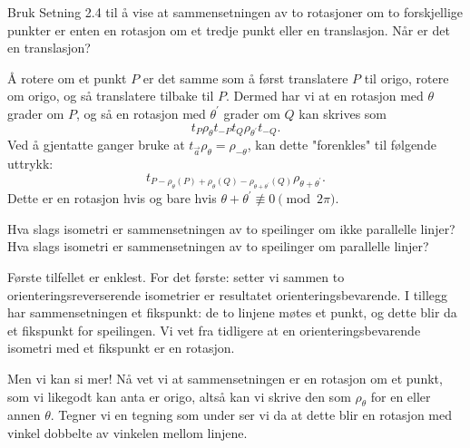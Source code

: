 \documentclass[11pt, norsk]{article}
\begin{document}
\begin{oppg}
Bruk Setning 2.4 til å vise at sammensetningen av to rotasjoner om to forskjellige punkter er enten en rotasjon om et tredje punkt eller en translasjon. Når er det en translasjon?  
\end{oppg}
\begin{losn}
Å rotere om et punkt $P$ er det samme som å først translatere $P$ til origo, rotere om origo, og så translatere tilbake til $P$. Dermed har vi at en rotasjon med $\theta$ grader om $P$, og så en rotasjon med $\theta^\prime$ grader om $Q$ kan skrives som
$$
t_P \rho_\theta t_{-P} t_Q \rho_{\theta^\prime} t_{-Q}.
$$
Ved å  gjentatte ganger bruke at $t_{\vec a} \rho_{\theta} = \rho_{-\theta}$, kan dette "forenkles" til følgende uttrykk: 
$$
t_{P-\rho_\theta(P)+\rho_\theta(Q)-\rho_{\theta+\theta^\prime}(Q)} \rho_{\theta+\theta^\prime}.
$$
Dette er en rotasjon hvis og bare hvis $\theta+\theta^\prime \not \equiv 0 \pmod {2\pi}$.
\end{losn}


\begin{oppg}
Hva slags isometri er sammensetningen av to speilinger om ikke parallelle linjer? Hva slags isometri er sammensetningen av to speilinger om parallelle linjer?
\end{oppg}

\begin{losn}
Første tilfellet er enklest. For det første: setter vi sammen to orienteringsreverserende isometrier er resultatet orienteringsbevarende. I tillegg har sammensetningen et fikspunkt: de to linjene møtes et punkt, og dette blir da et fikspunkt for speilingen. Vi vet fra tidligere at en orienteringsbevarende isometri med et fikspunkt er en rotasjon.

Men vi kan si mer! Nå vet vi at sammensetningen er en rotasjon om et punkt, som vi likegodt kan anta er origo, altså kan vi skrive den som $\rho_\theta$ for en eller annen $\theta$. Tegner vi en tegning som under ser vi da at dette blir en rotasjon med vinkel dobbelte av vinkelen mellom linjene.
\begin{figure}[h]
\begin{center}
\end{center}
\end{figure}
\end{losn}
\end{document}
